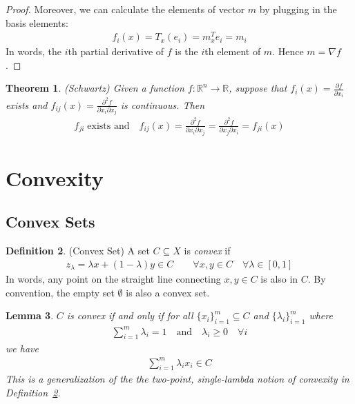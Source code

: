 \documentclass[12pt]{article}
\numberwithin{equation}{section} %
\theoremstyle{plain}
\newtheorem{thm}{Theorem}[section]
\newtheorem{lem}[thm]{Lemma}
\theoremstyle{definition}
\newtheorem{defn}[thm]{Definition}
\theoremstyle{remark}
\newcommand{\R}{\mathbb{R}}
\newcommand{\Rn}{\mathbb{R}^n}
\begin{document}
\begin{proof}
Moreover, we can calculate the elements of vector $m$ by plugging in the
basis elements:
\begin{align*}
  f_i(x) = T_x(e_i) = m^T_x e_i = m_i
\end{align*}
In words, the $i$th partial derivative of $f$ is the $i$th element of
$m$. Hence $m = \nabla f$.
\end{proof}

\begin{thm}{\emph{(Schwartz)}}
Given a function $f:\Rn\rightarrow\R$, suppose that
$f_i(x)=\frac{\partial f}{\partial x_i}$ exists and
$f_{ij}(x)=\frac{\partial^2 f}{\partial x_i\partial x_j}$ is continuous.
Then
\begin{align*}
  f_{ji} \; \text{exists and} \quad
  f_{ij}(x)=\frac{\partial^2 f}{\partial x_i\partial x_j}
  = \frac{\partial^2 f}{\partial x_j\partial x_i} = f_{ji}(x)
\end{align*}
\end{thm}

\section{Convexity}

\subsection{Convex Sets}

\begin{defn}{(Convex Set)}
\label{defn:convexset}
A set $C\subseteq X$ is \emph{convex} if
\begin{align*}
  z_\lambda = \lambda x + (1-\lambda) y \in C
  \qquad \forall x,y\in C\quad \forall \lambda \in [0,1]
\end{align*}
In words, any point on the straight line connecting $x,y\in C$ is also
in $C$. By convention, the empty set $\emptyset$ is also a convex set.
\end{defn}

\begin{lem}
$C$ is convex if and only if
for all $\{x_i\}_{i=1}^m \subseteq C$ and $\{\lambda_i\}_{i=1}^m$ where
\begin{align*}
  \sum^{m}_{i=1} \lambda_i = 1
  \quad \text{and} \quad \lambda_i \geq 0 \quad \forall i
\end{align*}
we have
\begin{align*}
  \sum^m_{i=1} \lambda_i x_i \in C
\end{align*}
This is a generalization of the the two-point, single-lambda notion of
convexity in Definition~\ref{defn:convexset}.
\end{lem}
\end{document}
